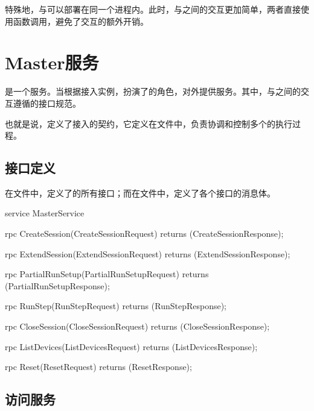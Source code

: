 \begin{content}
特殊地，与可以部署在同一个进程内。此时，与之间的交互更加简单，两者直接使用函数调用，避免了交互的额外开销。

\section{Master服务}

\begin{content}

是一个服务。当根据接入实例，扮演了的角色，对外提供服务。其中，与之间的交互遵循的接口规范。

也就是说，定义了接入的契约，它定义在文件中，负责协调和控制多个的执行过程。

\subsection{接口定义}

在文件中，定义了的所有接口；而在文件中，定义了各个接口的消息体。

\begin{leftbar}
\begin{c++}
service MasterService {
  rpc CreateSession(CreateSessionRequest) 
      returns (CreateSessionResponse);
  
  rpc ExtendSession(ExtendSessionRequest) 
      returns (ExtendSessionResponse);

  rpc PartialRunSetup(PartialRunSetupRequest) 
      returns (PartialRunSetupResponse);

  rpc RunStep(RunStepRequest) 
      returns (RunStepResponse);
  
  rpc CloseSession(CloseSessionRequest) 
      returns (CloseSessionResponse);
  
  rpc ListDevices(ListDevicesRequest) 
      returns (ListDevicesResponse);

  rpc Reset(ResetRequest) 
      returns (ResetResponse);
}
\end{c++}
\end{leftbar}

\subsection{访问服务}


\end{content}
\end{content}
